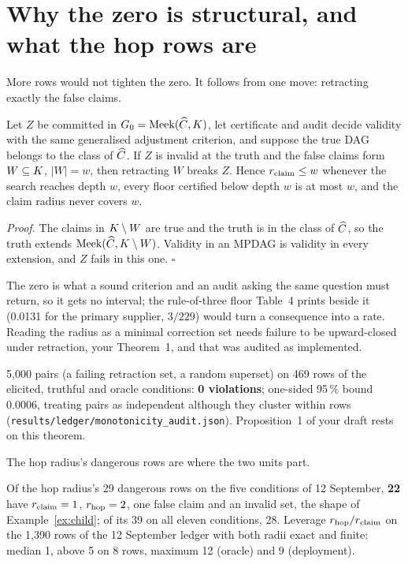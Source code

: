 \section{Why the zero is structural, and what the hop rows are}\label{sec:t4-why}

More rows would not tighten the zero. It follows from one move: retracting exactly the false claims.

\begin{proposicao}\label{prop:t4-structural}
Let $Z$ be committed in $G_0 = \mathrm{Meek}(\widehat{C}, K)$, let certificate and audit decide validity
with the same generalised adjustment criterion, and suppose the true DAG belongs to the class of
$\widehat{C}$. If $Z$ is invalid at the truth and the false claims form $W \subseteq K$, $|W| = w$, then
retracting $W$ breaks $Z$. Hence $r_{\mathrm{claim}} \le w$ whenever the search reaches depth $w$, every floor
certified below depth $w$ is at most $w$, and the claim radius never covers $w$.
\end{proposicao}

\noindent\emph{Proof.} The claims in $K \setminus W$ are true and the truth is in the class of
$\widehat{C}$, so the truth extends $\mathrm{Meek}(\widehat{C}, K \setminus W)$. Validity in an MPDAG is
validity
in every extension, and $Z$ fails in this one. \hfill$\square$

The zero is what a sound criterion and an audit asking the same question must return, so it gets no
interval; the rule-of-three floor Table~4 prints beside it (0.0131 for the primary supplier, $3/229$)
would turn a consequence into a rate. Reading the radius as a minimal correction set needs failure to be
upward-closed under retraction, your Theorem~1, and that was audited as implemented.

\begin{medido}
5,000 pairs (a failing retraction set, a random superset) on 469 rows of the elicited, truthful and
oracle conditions: \textbf{0 violations}; one-sided 95\,\% bound 0.0006, treating pairs as independent
although they cluster within rows (\texttt{results/ledger/monotonicity\_audit.json}). Proposition~1 of
your draft rests on this theorem.
\end{medido}

The hop radius's dangerous rows are where the two units part.

\begin{medido}
Of the hop radius's 29 dangerous rows on the five conditions of 12 September, \textbf{22} have
$r_{\mathrm{claim}} = 1$, $r_{\mathrm{hop}} = 2$, one false claim and an invalid set, the shape of Example~\ref{ex:child}; of
its 39 on all eleven conditions, 28. Leverage $r_{\mathrm{hop}}/r_{\mathrm{claim}}$ on the 1,390 rows of the 12 September
ledger with both radii exact and finite: median 1, above 5 on 8 rows, maximum 12 (oracle) and 9
(deployment).
\end{medido}

